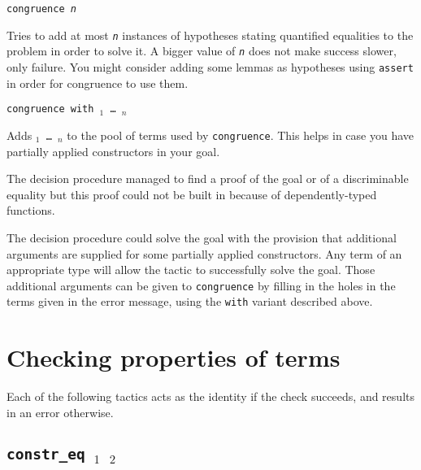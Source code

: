\begin{coq_example*}
\begin{Variants}
 \item {\tt congruence {\sl n}}

  Tries to add at most {\tt \sl n} instances of hypotheses stating quantified equalities to the problem in order to solve it. A bigger value of {\tt \sl n} does not make success slower, only failure. You might consider adding some lemmas as hypotheses using {\tt assert} in order for congruence to use them.

\item {\tt congruence with \term$_1$ \dots\ \term$_n$}

  Adds {\tt \term$_1$ \dots\ \term$_n$} to the pool of terms used by
  {\tt congruence}. This helps in case you have partially applied
  constructors in your goal.
\end{Variants}

\begin{ErrMsgs}
  \item {}

    The decision procedure managed to find a proof of the goal or of
    a discriminable equality but this proof could not be built in {\Coq}
    because of dependently-typed functions.

  \item {}

    The decision procedure could solve the goal with the provision
    that additional arguments are supplied for some partially applied
    constructors. Any term of an appropriate type will allow the
    tactic to successfully solve the goal. Those additional arguments
    can be given to {\tt congruence} by filling in the holes in the
    terms given in the error message, using the {\tt with} variant
    described above.
\end{ErrMsgs}


\section{Checking properties of terms}

Each of the following tactics acts as the identity if the check succeeds, and results in an error otherwise.

\subsection{\tt constr\_eq \term$_1$ \term$_2$}
\label{constreq}


\end{coq_example*}
